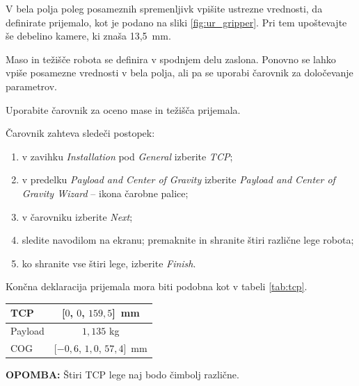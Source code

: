 \begin{mdframed}[backgroundcolor=yellow!20, shadow=true,roundcorner=8pt]
V bela polja poleg posameznih spremenljivk vpišite ustrezne vrednosti, da definirate prijemalo, kot je podano na sliki \ref{fig:ur_gripper}. Pri tem upoštevajte še debelino kamere, ki znaša 13,5~mm.
\end{mdframed}


Maso in težišče robota se definira v spodnjem delu zaslona. Ponovno se lahko vpiše posamezne vrednosti v bela polja, ali pa se uporabi čarovnik za določevanje parametrov.

\begin{mdframed}[backgroundcolor=yellow!20, shadow=true,roundcorner=8pt]
Uporabite čarovnik za oceno mase in težišča prijemala.
\end{mdframed}

Čarovnik zahteva sledeči postopek:
\begin{enumerate}
\item v zavihku \emph{Installation} pod \emph{General} izberite \emph{TCP};
\item v predelku \emph{Payload and Center of Gravity} izberite \emph{Payload and Center of Gravity Wizard} -- ikona čarobne palice;
\item v čarovniku izberite \emph{Next};
\item sledite navodilom na ekranu; premaknite in shranite štiri različne lege robota;
\item ko shranite vse štiri lege, izberite \emph{Finish}.
\end{enumerate}

Končna deklaracija prijemala mora biti podobna kot v tabeli \ref{tab:tcp}.

\begin{center}
\begin{tabular}{|l|c|}
  \hline
  TCP & [$0$, $0$, $159,5$]~mm \\
  \hline
  Payload & $1,135$ kg \\
  \hline
  COG & [$-0,6$, $1,0$, $57,4$]~mm\\
  \hline
\end{tabular}
\label{tab:tcp}
\end{center}

\begin{mdframed}[backgroundcolor=blue!20, shadow=true,roundcorner=8pt]
\textbf{OPOMBA:} Štiri TCP lege naj bodo čimbolj različne.
\end{mdframed}

